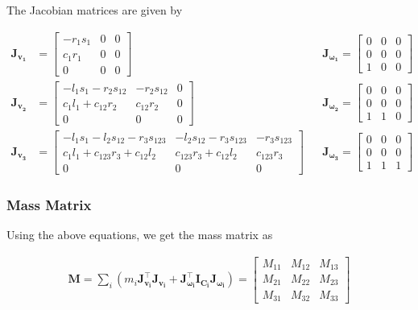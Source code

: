 The Jacobian matrices are given by

\begin{align}
    \mathbf{J_{v_1}} &= \left[\begin{matrix}- r_{1} s_{1} & 0 & 0\\c_{1} r_{1} & 0 & 0\\0 & 0 & 0\end{matrix}\right]
    &&
    \mathbf{J_{\omega_1}} = \left[\begin{matrix}0 & 0 & 0\\0 & 0 & 0\\1 & 0 & 0\end{matrix}\right]
    \\
    \mathbf{J_{v_2}} &= \left[\begin{matrix}- l_{1} s_{1} - r_{2} s_{12} & - r_{2} s_{12} & 0\\c_{1} l_{1} + c_{12} r_{2} & c_{12} r_{2} & 0\\0 & 0 & 0\end{matrix}\right]
    &&
    \mathbf{J_{\omega_2}} = \left[\begin{matrix}0 & 0 & 0\\0 & 0 & 0\\1 & 1 & 0\end{matrix}\right]
    \\
    \mathbf{J_{v_3}} &= \left[\begin{matrix}- l_{1} s_{1} - l_{2} s_{12} - r_{3} s_{123} & - l_{2} s_{12} - r_{3} s_{123} & - r_{3} s_{123}\\c_{1} l_{1} + c_{123} r_{3} + c_{12} l_{2} & c_{123} r_{3} + c_{12} l_{2} & c_{123} r_{3}\\0 & 0 & 0\end{matrix}\right]
    &&
    \mathbf{J_{\omega_3}} = \left[\begin{matrix}0 & 0 & 0\\0 & 0 & 0\\1 & 1 & 1\end{matrix}\right]
\end{align}

\subsubsection*{Mass Matrix}

Using the above equations, we get the mass matrix as

\begin{align}
    \mathbf{M} = \sum_i \left ( m_i \mathbf{J_{v_i}^\top J_{v_i} + J_{\omega_i}^\top I_{C_i} J_{\omega_i}} \right ) = \begin{bmatrix}
        M_{11} & M_{12} & M_{13} \\
        M_{21} & M_{22} & M_{23} \\
        M_{31} & M_{32} & M_{33}
        \end{bmatrix}
    \label{eq:3r-dyn-mass-matrix}
\end{align}

